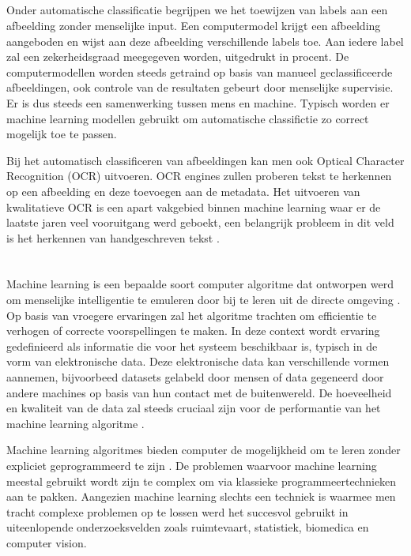 \subsection{}
\label{sec:automatic-classification}
Onder automatische classificatie begrijpen we het toewijzen van labels aan een afbeelding zonder menselijke input. Een computermodel krijgt een afbeelding aangeboden en wijst aan deze afbeelding verschillende labels toe. Aan iedere label zal een zekerheidsgraad meegegeven worden, uitgedrukt in procent. De computermodellen worden steeds getraind op basis van manueel geclassificeerde afbeeldingen, ook controle van de resultaten gebeurt door menselijke supervisie. Er is dus steeds een samenwerking tussen mens en machine. Typisch worden er machine learning modellen gebruikt om automatische classifictie zo correct mogelijk toe te passen.

Bij het automatisch classificeren van afbeeldingen kan men ook Optical Character Recognition (OCR) uitvoeren. OCR engines zullen proberen tekst te herkennen op een afbeelding en deze toevoegen aan de metadata. Het uitvoeren van kwalitatieve OCR is een apart vakgebied binnen machine learning waar er de laatste jaren veel vooruitgang werd geboekt, een belangrijk probleem in dit veld is het herkennen van handgeschreven tekst \autocite{Breuel2013}.

\section{}
\label{sec:machine-learning}
Machine learning is een bepaalde soort computer algoritme dat ontworpen werd om menselijke intelligentie te emuleren door bij te leren uit de directe omgeving \autocite{ElNaqa2015}. Op basis van vroegere ervaringen zal het algoritme trachten om efficientie te verhogen of correcte voorspellingen te maken. In deze context wordt ervaring gedefinieerd als informatie die voor het systeem beschikbaar is, typisch in de vorm van elektronische data. Deze elektronische data kan verschillende vormen aannemen, bijvoorbeed datasets gelabeld door mensen of data gegeneerd door andere machines op basis van hun contact met de buitenwereld. De hoeveelheid en kwaliteit van de data zal steeds cruciaal zijn voor de performantie van het machine learning algoritme \autocite{Mohri2018}.

Machine learning algoritmes bieden computer de mogelijkheid om te leren zonder expliciet geprogrammeerd te zijn \autocite{DeVreese2017}. De problemen waarvoor machine learning meestal gebruikt wordt zijn te complex om via klassieke programmeertechnieken aan te pakken. Aangezien machine learning slechts een techniek is waarmee men tracht complexe problemen op te lossen werd het succesvol gebruikt in uiteenlopende onderzoeksvelden zoals ruimtevaart, statistiek, biomedica en computer vision.

